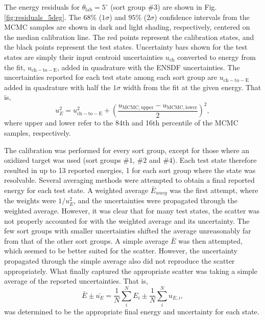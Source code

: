 The energy residuals for $\theta_{\mathrm{lab}} = 5^{\circ}$ (sort group $\#$3) are shown in Fig. \ref{fig:residuals_5deg}. The $68\%$ ($1\sigma$) and $95\%$ ($2\sigma$) confidence intervals from the MCMC samples are shown in dark and light shading, respectively, centered on the median calibration line. The red points represent the calibration states, and the black points represent the test states. Uncertainty bars shown for the test states are simply their input centroid uncertainties $u_{\mathrm{ch}}$ converted to energy from the fit, $u_{\mathrm{ch-to-E}}$, added in quadrature with the ENSDF uncertainties. The uncertainties reported for each test state among each sort group are $u_{\mathrm{ch-to-E}}$ added in quadrature with half the $1\sigma$ width from the fit at the given energy. That is,
\begin{equation}
u_{E}^{2} = u_{\mathrm{ch-to-E}}^{2} + \left( \frac{u_{\mathrm{MCMC, upper}} - u_{\mathrm{MCMC, lower}}}{2} \right)^{2},
\end{equation}
where upper and lower refer to the 84th and 16th percentile of the MCMC samples, respectively.

The calibration was performed for every sort group, except for those where an oxidized target was used (sort groups $\#1$, $\#2$ and $\#4$). Each test state therefore resulted in up to 13 reported energies, 1 for each sort group where the state was resolvable. Several averaging methods were attempted to obtain a final reported energy for each test state. A weighted average $\bar{E}_{wavg}$ was the first attempt, where the weights were $1/u_{E}^{2}$, and the uncertainties were propagated through the weighted average. However, it was clear that for many test states, the scatter was not properly accounted for with the weighted average and its uncertainty. The few sort groups with smaller uncertainties shifted the average unreasonably far from that of the other sort groups. A simple average $\bar{E}$ was then attempted, which seemed to be better suited for the scatter. However, the uncertainty propagated through the simple average also did not reproduce the scatter appropriately. What finally captured the appropriate scatter was taking a simple average of the reported uncertainties. That is,
\begin{equation} \label{eqn:simple_avg}
\bar{E} \pm \bar{u_{E}} = \frac{1}{N}\sum_{i}^{N}{E_{i}} \pm \frac{1}{N}\sum_{i}^{N}{u_{E, i}},
\end{equation}
was determined to be the appropriate final energy and uncertainty for each state.

